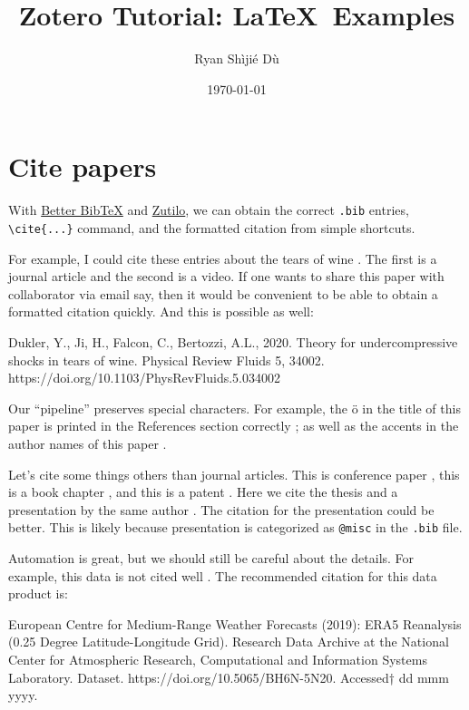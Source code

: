 \documentclass[11pt,letterpaper]{article}
\title{Zotero Tutorial: \LaTeX\ Examples}
\author{Ryan Sh\`iji\'e D\`u}
\date{\today}
\begin{document}


\maketitle

\section{Cite papers}
With 
\href{https://retorque.re/zotero-better-bibtex/}{Better BibTeX}
and 
\href{https://github.com/wshanks/Zutilo}{Zutilo}, we can obtain the correct \texttt{.bib} entries, \verb|\cite{...}| command, and the formatted citation from simple shortcuts. 

For example, I could cite these entries about the tears of wine \cite{DuklerEtAl_20, PhysicsGirl_19}. The first is a journal article and the second is a video. If one wants to share this paper with collaborator via email say, then it would be convenient to be able to obtain a formatted citation quickly. And this is possible as well:\vspace*{2mm}\\
\;\hspace*{1cm}
\begin{minipage}{.9\textwidth}
    Dukler, Y., Ji, H., Falcon, C., Bertozzi, A.L., 2020. Theory for undercompressive shocks in tears of wine. Physical Review Fluids 5, 34002. https://doi.org/10.1103/PhysRevFluids.5.034002
\end{minipage}

Our ``pipeline'' preserves special characters. For example, the \"o in the title of this paper is printed in the References section correctly \cite{Vanneste_21}; as well as the accents in the author names of this paper \cite{Caspar-CohenEtAl_21}.

Let's cite some things others than journal articles. This is conference paper \cite{Diamantakis_14}, this is a book chapter \cite{GulaEtAl_22a}, and this is a patent \cite{TERANEtAl_18}. Here we cite the thesis and a presentation by the same author \cite{Shakespeare_15,Shakespeare_21}. The citation for the presentation could be better. This is likely because presentation is categorized as \verb|@misc| in the \texttt{.bib} file. 

Automation is great, but we should still be careful about the details. For example, this data is not cited well \cite{cisl_rda_ds633.3}. The recommended citation for this data product is:\vspace*{2mm}\\
\;\hspace*{1cm}
\begin{minipage}{.9\textwidth}%
European Centre for Medium-Range Weather Forecasts (2019): ERA5 Reanalysis (0.25 Degree Latitude-Longitude Grid). Research Data Archive at the National Center for Atmospheric Research, Computational and Information Systems Laboratory. Dataset. https://doi.org/10.5065/BH6N-5N20. Accessed† dd mmm yyyy.
\end{minipage}%



\newpage
\printbibliography
\end{document}
